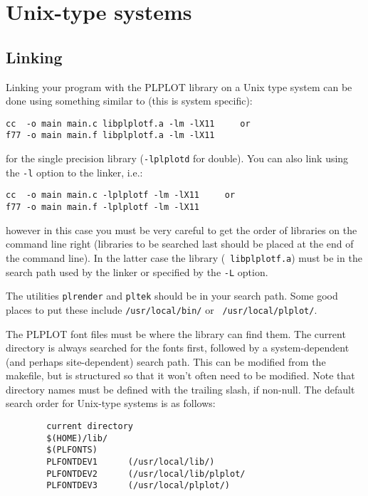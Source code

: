 \section{Unix-type systems}
\label{sec:unix}


\subsection{Linking}

Linking your program with the PLPLOT library on a Unix type
system can be done using something similar to (this is system specific):
\begin{verbatim}
cc  -o main main.c libplplotf.a -lm -lX11     or
f77 -o main main.f libplplotf.a -lm -lX11
\end{verbatim}
for the single precision library ({\tt -lplplotd} for double).  
You can also link using the {\tt -l} option to the linker,
i.e.:
\begin{verbatim}
cc  -o main main.c -lplplotf -lm -lX11     or
f77 -o main main.f -lplplotf -lm -lX11
\end{verbatim}
however in this case you must be very careful to get the order of libraries
on the command line right (libraries to be searched last should be placed at
the end of the command line).  In the latter case the library ({\tt
libplplotf.a}) must be in the search path used by the linker or specified by
the {\tt -L} option.

The utilities {\tt plrender} and {\tt pltek} should be in your search path.
Some good places to put these include {\tt /usr/local/bin/} or {\tt
/usr/local/plplot/}.

The PLPLOT font files must be where the library can find them.
The current directory is always searched for the fonts first, followed
by a system-dependent (and perhaps site-dependent) search path.
This can be modified from the makefile, but is structured so that it won't
often need to be modified.  Note that directory names must be defined with
the trailing slash, if non-null.  The default search order for Unix-type
systems is as follows:
\begin{verbatim}
        current directory
        $(HOME)/lib/
        $(PLFONTS)
        PLFONTDEV1      (/usr/local/lib/)
        PLFONTDEV2      (/usr/local/lib/plplot/
        PLFONTDEV3      (/usr/local/plplot/)
\end{verbatim}


